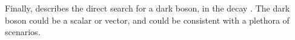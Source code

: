         Finally,  describes the direct search for a dark boson, \decay{\db}{\mumu} in
        the decay \decay{\Bd}{\Kstarent\mumu}.
        The dark boson could be a scalar or vector, and could be consistent with a plethora of \bsm
        scenarios.








